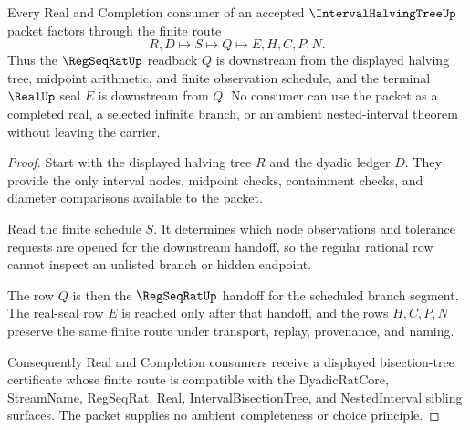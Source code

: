 \begin{theorem}
\label{thm:interval-halving-tree-regseqrat-handoff}
Every Real and Completion consumer of an accepted $\IntervalHalvingTreeUp$ packet factors through the finite route
$$
R,D \longmapsto S \longmapsto Q \longmapsto E,H,C,P,N .
$$
Thus the $\RegSeqRatUp$ readback $Q$ is downstream from the displayed halving tree, midpoint arithmetic, and finite observation schedule, and the terminal $\RealUp$ seal $E$ is downstream from $Q$. No consumer can use the packet as a completed real, a selected infinite branch, or an ambient nested-interval theorem without leaving the carrier.
\end{theorem}
\begin{proof}
Start with the displayed halving tree $R$ and the dyadic ledger $D$. They provide the only interval nodes, midpoint checks, containment checks, and diameter comparisons available to the packet.

Read the finite schedule $S$. It determines which node observations and tolerance requests are opened for the downstream handoff, so the regular rational row cannot inspect an unlisted branch or hidden endpoint.

The row $Q$ is then the $\RegSeqRatUp$ handoff for the scheduled branch segment. The real-seal row $E$ is reached only after that handoff, and the rows $H,C,P,N$ preserve the same finite route under transport, replay, provenance, and naming.

Consequently Real and Completion consumers receive a displayed bisection-tree certificate whose finite route is compatible with the DyadicRatCore, StreamName, RegSeqRat, Real, IntervalBisectionTree, and NestedInterval sibling surfaces. The packet supplies no ambient completeness or choice principle.
\end{proof}


\begin{closurestatus}{\IntervalHalvingTreeUp}
  \theoryclosure{\seedClosure}
  \formalstatus{\unformalizedV}
\end{closurestatus}
